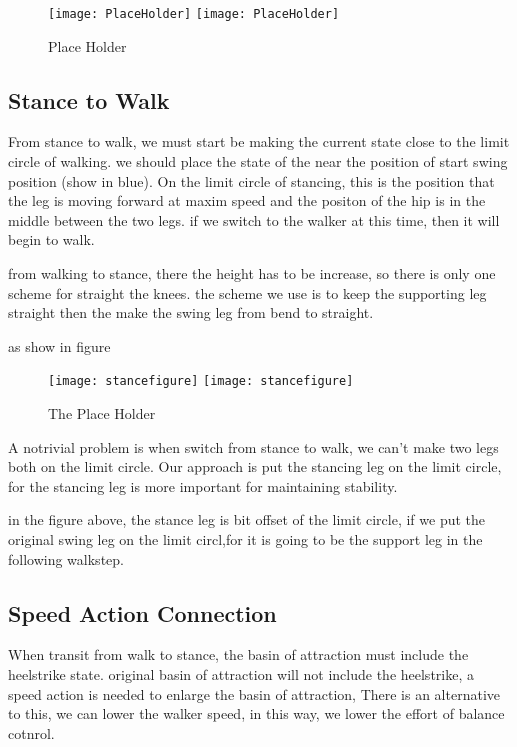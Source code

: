 \begin{figure}[!htbp]
  \begin{center}
    \leavevmode
    \ifpdf
      \texttt{[image: PlaceHolder]}
    \else
      \texttt{[image: PlaceHolder]}
    \fi
    \caption{Place Holder}
    \label{fig:walkstancebend}
\end{center}
\end{figure}

\subsection{Stance to Walk}
From stance to walk, we must start be making the current state close to the limit circle of walking.
we should place the state of the near the position of start swing position (show in blue).
On the limit circle of stancing, this is the position that the leg is moving forward at maxim speed and the positon of the hip is in the middle between the two legs.
if we switch to the walker at this time, then it will begin to walk.



from walking to stance, there the height has to be increase, so there is only one scheme for straight the knees.
the scheme we use is to keep the supporting leg straight then the make the swing leg from bend to straight.

as show in figure
\begin{figure}[!htbp]
  \begin{center}
    \leavevmode
    \ifpdf
      \texttt{[image: stancefigure]}
    \else
      \texttt{[image: stancefigure]}
    \fi
    \caption{The Place Holder}
    \label{fig:stance2walk}
\end{center}
\end{figure}


A notrivial problem is when switch from stance to walk, 
we can't make two legs both on the limit circle.
Our approach is put the stancing leg on the limit circle, for the stancing leg is more important for maintaining stability.


in the figure above, the stance leg is bit offset of the limit circle, if we put the original swing leg on the limit circl,for it is going to be the support leg in the following walkstep.


\subsection{Speed Action Connection}
When transit from walk to stance, the basin of attraction must include the heelstrike state.
original basin of attraction will not include the heelstrike, a speed action is needed to enlarge the basin of attraction,
There is an alternative to this, we can lower the walker speed, in this way, we lower the effort of balance cotnrol.

